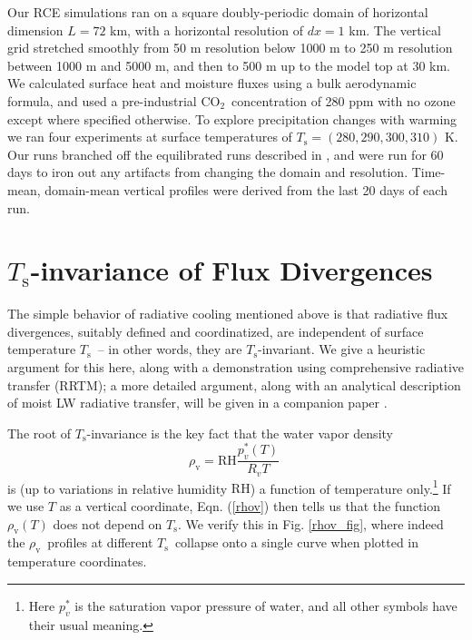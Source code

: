 \documentclass[10pt]{article}
\newcommand{\beqn}{\begin{equation}}
\newcommand{\eeqn}{\end{equation}}
\newcommand{\eqnref}[1]{(\ref{#1})}
\newcommand{\cotwo}{\ensuremath{\mathrm{CO_2}}}
\newcommand{\rhov}{\ensuremath{\rho_\mathrm{v}}}
\newcommand{\Ts}{\ensuremath{T_\mathrm{s}}}
\newcommand{\RH}{\ensuremath{\mathrm{RH}}}
\begin{document}
	Our RCE simulations ran on a square doubly-periodic domain of horizontal dimension $L=72$ km, with  a horizontal resolution of $dx=1$ km. The vertical grid stretched smoothly from 50 m resolution below 1000 m to 250 m resolution between 1000 m and 5000 m, and then to 500 m up to the model top at  30 km. We calculated surface heat and moisture fluxes using a bulk aerodynamic formula, and used a pre-industrial \cotwo\  concentration of 280 ppm with no ozone except where specified otherwise. To explore precipitation changes  with warming we ran four experiments at surface temperatures of $\Ts=(280,290,300,310)$ K. Our runs branched off the equilibrated runs described in \cite{romps2014}, and were run for 60 days  to iron out any artifacts from changing the domain and resolution. Time-mean,  domain-mean vertical profiles were derived from the last 20 days  of each run. 

\section{\Ts-invariance of Flux Divergences}
The simple behavior of radiative cooling mentioned above is that radiative flux divergences, suitably defined and  coordinatized, are independent of surface temperature \Ts\ -- in other words, they are \Ts-invariant. We give a heuristic argument for this here, along with a demonstration using comprehensive radiative transfer (RRTM); a more detailed argument, along with an analytical description of moist LW radiative transfer, will be given in a companion paper \citep{rad_cooling2}.

The root of \Ts-invariance is the key fact that  the water vapor density 
	\beqn
		\rhov =  \RH\frac{p_v^*(T)}{R_ vT} \; 
	\label{rhov}
	\eeqn
	 is (up to variations in relative humidity \RH) a function of temperature only.\footnote{Here $p_v^*$  is the saturation vapor pressure of water, and all other symbols have their usual meaning.} If we use $T$ as a vertical coordinate,  Eqn. \eqnref{rhov} then tells us that the function $\rhov(T)$ does not depend on \Ts.  We verify this  in Fig. \ref{rhov_fig}, where indeed  the \rhov\ profiles at different \Ts\ collapse onto a single curve when plotted in temperature coordinates.
	 
\end{document}
